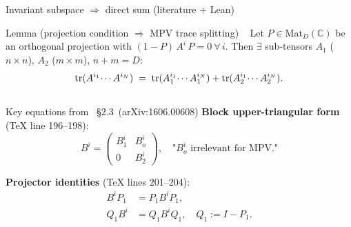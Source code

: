 \documentclass[aspectratio=169,10pt]{beamer}
\newcommand{\Mat}{\mathrm{Mat}}
\begin{document}
\begin{frame}{Invariant subspace $\Rightarrow$ direct sum (literature + Lean)}
    \vspace{-0.45em}

    \begin{block}{Lemma (projection condition $\Rightarrow$ MPV trace splitting)%
        ~\cite{Cirac2017Annals,Perez-Garcia2007Matrix}}
        Let $P\in\Mat_D(\mathbb{C})$ be an orthogonal projection with
        $(1{-}P)\,A^i\,P = 0\ \forall\,i$.
        Then $\exists$ sub-tensors $A_1$ ($n{\times}n$), $A_2$ ($m{\times}m$), $n+m=D$:
        \vspace{-0.3em}
        \[
            \mathrm{tr}(A^{i_1}\!\cdots A^{i_N})
            \;=\;
            \mathrm{tr}(A_1^{i_1}\!\cdots A_1^{i_N})
            +
            \mathrm{tr}(A_2^{i_1}\!\cdots A_2^{i_N}).
        \]
    \end{block}

    \begin{columns}[T]
        \begin{block}{Key equations from~\cite{Cirac2017Annals} \S2.3~(arXiv:1606.00608)}
            \textbf{Block upper-triangular form} (TeX line 196--198):
            \vspace{-0.2em}
            \[
                B^i = \begin{pmatrix}B_1^i & B_o^i \\ 0 & B_2^i\end{pmatrix},
                \quad \text{"$B^i_o$ irrelevant for MPV."}
            \]
            \vspace{-0.6em}

            \textbf{Projector identities} (TeX lines 201--204):
            \vspace{-0.2em}
            \begin{align*}
                B^i P_1 &= P_1 B^i P_1, \\[-0.1em]
                Q_1 B^i &= Q_1 B^i Q_1,\quad Q_1 := I{-}P_1.
            \end{align*}
            \vspace{-0.8em}


\end{block}
\end{columns}
\end{frame}
\end{document}
